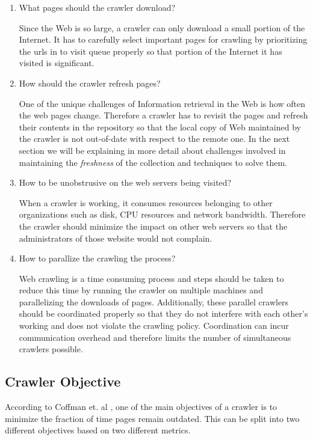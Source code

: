 \documentclass[a4paper, 11pt]{article} %
\begin{document}
\begin{enumerate}

\item What pages should the crawler download?

Since the Web is so large, a crawler can only download a small portion of the Internet. It has to carefully select important pages for crawling by prioritizing the urls in to visit queue properly so that portion of the Internet it has visited is significant.

\item How should the crawler refresh pages? 

One of the unique challenges of Information retrieval in the Web is how often the web pages change. Therefore a crawler has to revisit the pages and refresh their contents in the repository so that the local copy of Web maintained by the crawler is not out-of-date with respect to the remote one. In the next section we will be explaining in more detail about challenges involved in maintaining the \textit{freshness} of the collection and techniques to solve them.

\item How to be unobstrusive on the web servers being visited?

When a crawler is working, it consumes resources belonging to other organizations such as disk, CPU resources and network bandwidth. Therefore the crawler should minimize the impact on other web servers so that the administrators of those website would not complain.

\item How to parallize the crawling the process? 

Web crawling is a time consuming process and steps should be taken to reduce this time by running the crawler on multiple machines and parallelizing the downloads of pages. Additionally, these parallel crawlers should be coordinated properly so that they do not interfere with each other's working and does not violate the crawling policy. Coordination can incur communication overhead and therefore limits the number of simultaneous crawlers possible. 

\end{enumerate}

\subsection{Crawler Objective}

According to Coffman et. al \cite{coffman1997optimal}, one of the main objectives of a crawler is to minimize the fraction of time pages remain outdated. This can be split into two different objectives based on two different metrics. 
\end{document}
